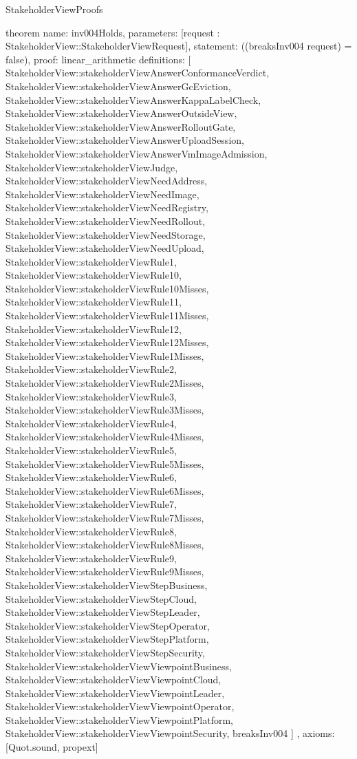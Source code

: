 \begin{lexlean}{StakeholderViewProofs}
\begin{semanticmodule}
theorem{
  name: inv004Holds,
  parameters: [request : StakeholderView::StakeholderViewRequest],
  statement: ((breaksInv004 request) = false),
  proof: linear_arithmetic{
    definitions: [
      StakeholderView::stakeholderViewAnswerConformanceVerdict,
      StakeholderView::stakeholderViewAnswerGcEviction,
      StakeholderView::stakeholderViewAnswerKappaLabelCheck,
      StakeholderView::stakeholderViewAnswerOutsideView,
      StakeholderView::stakeholderViewAnswerRolloutGate,
      StakeholderView::stakeholderViewAnswerUploadSession,
      StakeholderView::stakeholderViewAnswerVmImageAdmission,
      StakeholderView::stakeholderViewJudge,
      StakeholderView::stakeholderViewNeedAddress,
      StakeholderView::stakeholderViewNeedImage,
      StakeholderView::stakeholderViewNeedRegistry,
      StakeholderView::stakeholderViewNeedRollout,
      StakeholderView::stakeholderViewNeedStorage,
      StakeholderView::stakeholderViewNeedUpload,
      StakeholderView::stakeholderViewRule1,
      StakeholderView::stakeholderViewRule10,
      StakeholderView::stakeholderViewRule10Misses,
      StakeholderView::stakeholderViewRule11,
      StakeholderView::stakeholderViewRule11Misses,
      StakeholderView::stakeholderViewRule12,
      StakeholderView::stakeholderViewRule12Misses,
      StakeholderView::stakeholderViewRule1Misses,
      StakeholderView::stakeholderViewRule2,
      StakeholderView::stakeholderViewRule2Misses,
      StakeholderView::stakeholderViewRule3,
      StakeholderView::stakeholderViewRule3Misses,
      StakeholderView::stakeholderViewRule4,
      StakeholderView::stakeholderViewRule4Misses,
      StakeholderView::stakeholderViewRule5,
      StakeholderView::stakeholderViewRule5Misses,
      StakeholderView::stakeholderViewRule6,
      StakeholderView::stakeholderViewRule6Misses,
      StakeholderView::stakeholderViewRule7,
      StakeholderView::stakeholderViewRule7Misses,
      StakeholderView::stakeholderViewRule8,
      StakeholderView::stakeholderViewRule8Misses,
      StakeholderView::stakeholderViewRule9,
      StakeholderView::stakeholderViewRule9Misses,
      StakeholderView::stakeholderViewStepBusiness,
      StakeholderView::stakeholderViewStepCloud,
      StakeholderView::stakeholderViewStepLeader,
      StakeholderView::stakeholderViewStepOperator,
      StakeholderView::stakeholderViewStepPlatform,
      StakeholderView::stakeholderViewStepSecurity,
      StakeholderView::stakeholderViewViewpointBusiness,
      StakeholderView::stakeholderViewViewpointCloud,
      StakeholderView::stakeholderViewViewpointLeader,
      StakeholderView::stakeholderViewViewpointOperator,
      StakeholderView::stakeholderViewViewpointPlatform,
      StakeholderView::stakeholderViewViewpointSecurity,
      breaksInv004
    ]
  },
  axioms: [Quot.sound, propext]
}
\end{semanticmodule}
\end{lexlean}
